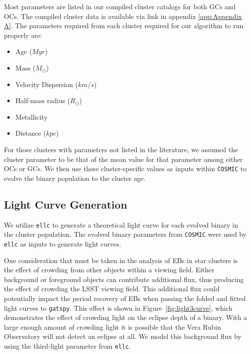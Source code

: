 \documentclass[twocolumn]{aastex63}
\begin{document}
 Most parameters are listed in our compiled cluster catalogs for both GCs and OCs. The compiled cluster data is available via link in appendix \ref{app:Appendix A}. The parameters required from each cluster required for our algorithm to run properly are:
 
\begin{itemize}
    \item Age ($Myr$)
    \item Mass ($M_{\odot}$)
    \item Velocity Dispersion ($km/s$)
    \item Half-mass radius ($R_{\odot}$)
    \item Metallicity
    \item Distance ($kpc$)
\end{itemize}
 For those clusters with parameters  not listed in the literature, we assumed the cluster parameter to be that of the mean value for that parameter among either OCs or GCs. We then use these cluster-specific values as inputs within \texttt{COSMIC} to evolve the binary population to the cluster age.
 
\subsection{Light Curve Generation}
\label{subsec:ellc}
 We utilize \texttt{ellc} \citep{2016ascl.soft03016M} to generate a theoretical light curve for each evolved binary in the cluster population. The evolved binary parameters from \texttt{COSMIC} were used by \texttt{ellc} as inputs to generate light curves.
 
One consideration that must be taken in the analysis of EBs in star clusters is the effect of crowding from other objects within a viewing field. Either background or foreground objects can contribute additional flux, thus producing the effect of crowding the LSST viewing field. This additional flux could potentially impact the period recovery of EBs when passing the folded and fitted light curves to \texttt{gatspy}. This effect is shown in Figure~\ref{fig:light3curve}, which demonstrates the effect of crowding light on the eclipse depth of a binary. With a large enough amount of crowding light it is possible that the Vera Rubin Observatory will not detect an eclipse at all. We model this background flux by using the third-light parameter from \texttt{ellc}.
 
\end{document}
